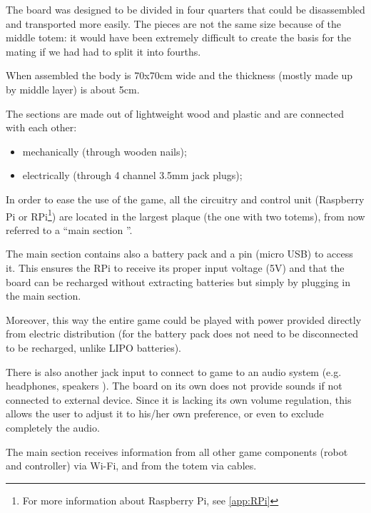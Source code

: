 \documentclass[a4paper,twoside]{book}
\begin{document}
The board was designed to be divided in four quarters that could be disassembled and transported more easily. The pieces are not the same size because of the middle totem: it would have been extremely difficult to create the basis for the  mating if we had had to split it into fourths.

When assembled the body is 70x70cm wide and the thickness (mostly made up by middle layer) is about 5cm.

The sections are made out of lightweight wood and plastic and are connected with each other:
\begin{itemize}
\item mechanically (through wooden nails);
\item electrically (through 4 channel 3.5mm jack plugs);
\end{itemize}
In order to ease the use of the game, all the circuitry and control unit (Raspberry Pi or RPi\footnote{For more information about Raspberry Pi, see \autoref{app:RPi}}) are located in the largest plaque (the one with two totems), from now referred to a \textquotedblleft main section \textquotedblright.

The main section contains also a battery pack and a pin (micro USB) to access it. This ensures the RPi to receive its proper input voltage (5V) and that the board can be recharged without extracting batteries but simply by plugging in the main section.

Moreover, this way the entire game could be played with power provided directly from electric distribution (for the battery pack does not need to be disconnected to be recharged, unlike LIPO batteries).

There is also another jack input to connect to game to an audio system (e.g. headphones, speakers \textellipsis). The board on its own does not provide sounds if not connected to external device. Since it is lacking its own volume regulation, this allows the user to adjust it to his/her own preference, or even to exclude completely the audio.

The main section receives information from all other game components (robot and controller) via Wi-Fi, and from the totem via cables.
\end{document}
